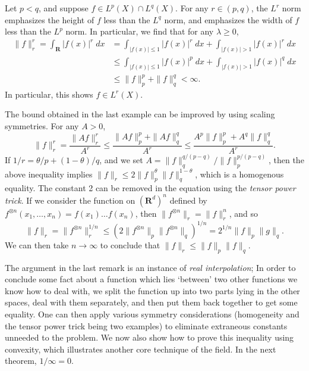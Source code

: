 \begin{example}
  Let $p < q$, and suppose $f \in L^p(X) \cap L^q(X)$. For any $r \in (p,q)$, the $L^r$ norm emphasizes the height of $f$ less than the $L^q$ norm, and emphasizes the width of $f$ less than the $L^p$ norm. In particular, we find that for any $\lambda \geq 0$,
  \begin{align*}
    \| f \|_r^r = \int_{\mathbf{R}} |f(x)|^r\; dx &= \int_{|f(x)| \leq 1} |f(x)|^r\; dx + \int_{|f(x)| > 1} |f(x)|^r\; dx\\
    &\leq \int_{|f(x)| \leq 1} |f(x)|^p\; dx + \int_{|f(x)| > 1} |f(x)|^q\; dx\\
    &\leq \| f \|_p^p + \| f \|_q^q < \infty.
  \end{align*}
  In particular, this shows $f \in L^r(X)$.
\end{example}

\begin{remark}
    The bound obtained in the last example can be improved by using scaling symmetries. For any $A > 0$,
    \[ \| f \|_r^r = \frac{\| Af \|_r^r}{A^r} \leq \frac{\| Af \|_p^p + \| Af \|_q^q}{A^r} \leq \frac{A^p \| f \|_p^p + A^q \| f \|_q^q}{A^r}. \]
    If $1/r = \theta/p + (1 - \theta)/q$, and we set $A = \| f \|_q^{q/(p-q)} / \| f \|_p^{p/(p-q)}$, then the above inequality implies $\| f \|_r \leq 2 \| f \|_p^\theta \| f \|_q^{1 - \theta}$, which is a homogenous equality. The constant 2 can be removed in the equation using the {\it tensor power trick}. If we consider the function on $(\mathbf{R}^d)^n$ defined by $f^{\otimes n}(x_1, \dots, x_n) = f(x_1) \dots f(x_n)$, then $\| f^{\otimes n} \|_r = \| f \|_r^n$, and so
    \[ \| f \|_r = \| f^{\otimes n} \|_r^{1/n} \leq \left( 2 \| f^{\otimes n} \|_p \| f^{\otimes n} \|_q \right)^{1/n} = 2^{1/n} \| f \|_p \| g \|_q. \]
    We can then take $n \to \infty$ to conclude that $\| f \|_r \leq \| f \|_p \| f \|_q$.
\end{remark}

The argument in the last remark is an instance of \emph{real interpolation}; In order to conclude some fact about a function which lies `between' two other functions we know how to deal with, we split the function up into two parts lying in the other spaces, deal with them separately, and then put them back together to get some equality. One can then apply various symmetry considerations (homogeneity and the tensor power trick being two examples) to eliminate extraneous constants unneeded to the problem. We now also show how to prove this inequality using convexity, which illustrates another core technique of the field. In the next theorem, $1/\infty = 0$.

